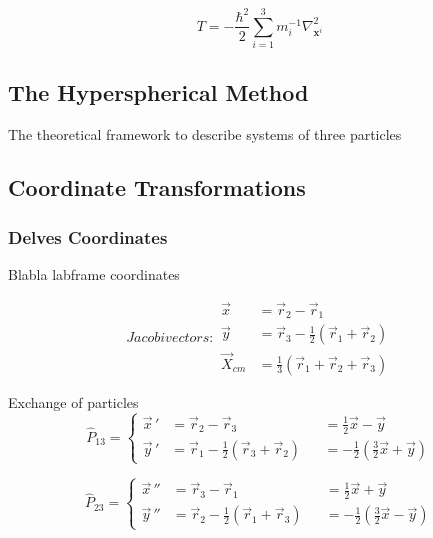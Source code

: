 \documentclass{article}
\begin{document}
\begin{equation}
T = -\frac{\hbar^2}{2} \sum_{i=1}^{3} m_{i}^{-1} \nabla^{2}_{\mathbf{x}^{i}}
\end{equation}

\subsection{The Hyperspherical Method}

The theoretical framework to describe systems of three particles 

\subsection{Coordinate Transformations}
\subsubsection{Delves Coordinates}

Blabla labframe coordinates

\begin{subequations}
Jacobi vectors:
\begin{align}
        \vec{x} 		&= \vec{r}_2 - \vec{r}_1\\
        \vec{y} 		&= \vec{r}_3 - \frac{1}{2}(\vec{r}_1 + \vec{r}_2)\\
        \vec{X}_{cm} 	&= \frac{1}{3} (\vec{r}_1 + \vec{r}_2 + \vec{r}_3)
\end{align}
\end{subequations}

Exchange of particles
\begin{equation}
\hat{P}_{13} = \left \{ \begin{aligned}
        \vec{x} \, ' &= \vec{r}_2 - \vec{r}_3 &&= \frac{1}{2}\vec{x} - \vec{y} \\
        \vec{y} \, ' &= \vec{r}_1 - \frac{1}{2}(\vec{r}_3 + \vec{r}_2) &&= -\frac{1}{2} (\frac{3}{2} \vec{x} + \vec{y})
       \end{aligned}
 \right.
 \end{equation}
 
\begin{equation}
\hat{P}_{23} = \left \{ \begin{aligned}
        \vec{x} \, '' &= \vec{r}_3 - \vec{r}_1 &&= \frac{1}{2}\vec{x} + \vec{y} \\
        \vec{y} \, '' &= \vec{r}_2 - \frac{1}{2}(\vec{r}_1 + \vec{r}_3) &&= -\frac{1}{2} (\frac{3}{2} \vec{x} - \vec{y})
       \end{aligned}
 \right.
 \end{equation}
\end{document}
